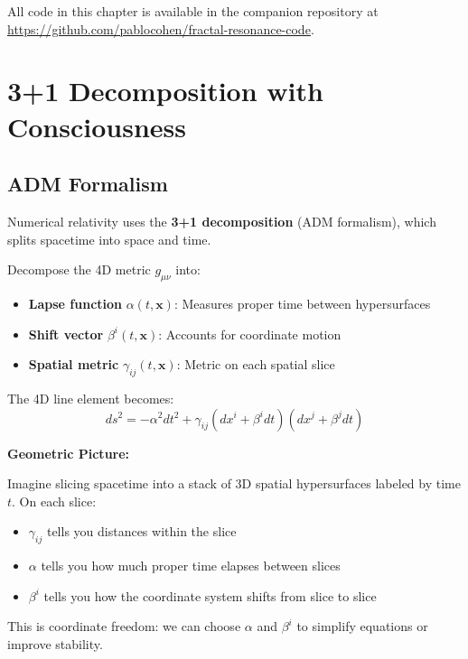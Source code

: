 All code in this chapter is available in the companion repository at \url{https://github.com/pablocohen/fractal-resonance-code}.

\section{3+1 Decomposition with Consciousness}

\subsection{ADM Formalism}

Numerical relativity\cite{baumgarte2010,misner1973} uses the \textbf{3+1 decomposition} (ADM formalism), which splits spacetime into space and time.

\begin{definition}\label{def:adm-variables}
Decompose the 4D metric $g_{\mu\nu}$ into:
\begin{itemize}
\item \textbf{Lapse function} $\alpha(t, \mathbf{x})$: Measures proper time between hypersurfaces
\item \textbf{Shift vector} $\beta^i(t, \mathbf{x})$: Accounts for coordinate motion
\item \textbf{Spatial metric} $\gamma_{ij}(t, \mathbf{x})$: Metric on each spatial slice
\end{itemize}

The 4D line element becomes:
\begin{equation}
ds^2 = -\alpha^2 dt^2 + \gamma_{ij} (dx^i + \beta^i dt)(dx^j + \beta^j dt)
\end{equation}
\end{definition}

\begin{level1}
\textbf{Geometric Picture:}

Imagine slicing spacetime into a stack of 3D spatial hypersurfaces labeled by time $t$. On each slice:
\begin{itemize}
\item $\gamma_{ij}$ tells you distances within the slice
\item $\alpha$ tells you how much proper time elapses between slices
\item $\beta^i$ tells you how the coordinate system shifts from slice to slice
\end{itemize}

This is coordinate freedom: we can choose $\alpha$ and $\beta^i$ to simplify equations or improve stability.
\end{level1}

